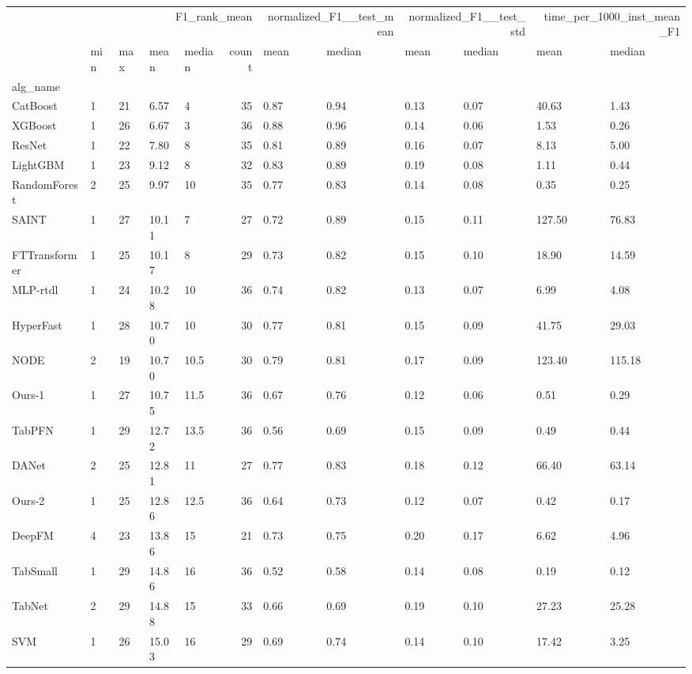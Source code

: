 \begin{tabular}{lllllrllllll}
\toprule
 & \multicolumn{5}{r}{F1_rank_mean} & \multicolumn{2}{r}{normalized_F1__test_mean} & \multicolumn{2}{r}{normalized_F1__test_std} & \multicolumn{2}{r}{time_per_1000_inst_mean_F1} \\
 & min & max & mean & median & count & mean & median & mean & median & mean & median \\
alg_name &  &  &  &  &  &  &  &  &  &  &  \\
\midrule
CatBoost & 1 & 21 & 6.57 & 4 & 35 & 0.87 & 0.94 & 0.13 & 0.07 & 40.63 & 1.43 \\
XGBoost & 1 & 26 & 6.67 & 3 & 36 & 0.88 & 0.96 & 0.14 & 0.06 & 1.53 & 0.26 \\
ResNet & 1 & 22 & 7.80 & 8 & 35 & 0.81 & 0.89 & 0.16 & 0.07 & 8.13 & 5.00 \\
LightGBM & 1 & 23 & 9.12 & 8 & 32 & 0.83 & 0.89 & 0.19 & 0.08 & 1.11 & 0.44 \\
RandomForest & 2 & 25 & 9.97 & 10 & 35 & 0.77 & 0.83 & 0.14 & 0.08 & 0.35 & 0.25 \\
SAINT & 1 & 27 & 10.11 & 7 & 27 & 0.72 & 0.89 & 0.15 & 0.11 & 127.50 & 76.83 \\
FTTransformer & 1 & 25 & 10.17 & 8 & 29 & 0.73 & 0.82 & 0.15 & 0.10 & 18.90 & 14.59 \\
MLP-rtdl & 1 & 24 & 10.28 & 10 & 36 & 0.74 & 0.82 & 0.13 & 0.07 & 6.99 & 4.08 \\
HyperFast & 1 & 28 & 10.70 & 10 & 30 & 0.77 & 0.81 & 0.15 & 0.09 & 41.75 & 29.03 \\
NODE & 2 & 19 & 10.70 & 10.5 & 30 & 0.79 & 0.81 & 0.17 & 0.09 & 123.40 & 115.18 \\
Ours-1 & 1 & 27 & 10.75 & 11.5 & 36 & 0.67 & 0.76 & 0.12 & 0.06 & 0.51 & 0.29 \\
TabPFN & 1 & 29 & 12.72 & 13.5 & 36 & 0.56 & 0.69 & 0.15 & 0.09 & 0.49 & 0.44 \\
DANet & 2 & 25 & 12.81 & 11 & 27 & 0.77 & 0.83 & 0.18 & 0.12 & 66.40 & 63.14 \\
Ours-2 & 1 & 25 & 12.86 & 12.5 & 36 & 0.64 & 0.73 & 0.12 & 0.07 & 0.42 & 0.17 \\
DeepFM & 4 & 23 & 13.86 & 15 & 21 & 0.73 & 0.75 & 0.20 & 0.17 & 6.62 & 4.96 \\
TabSmall & 1 & 29 & 14.86 & 16 & 36 & 0.52 & 0.58 & 0.14 & 0.08 & 0.19 & 0.12 \\
TabNet & 2 & 29 & 14.88 & 15 & 33 & 0.66 & 0.69 & 0.19 & 0.10 & 27.23 & 25.28 \\
SVM & 1 & 26 & 15.03 & 16 & 29 & 0.69 & 0.74 & 0.14 & 0.10 & 17.42 & 3.25 \\

\end{tabular}
